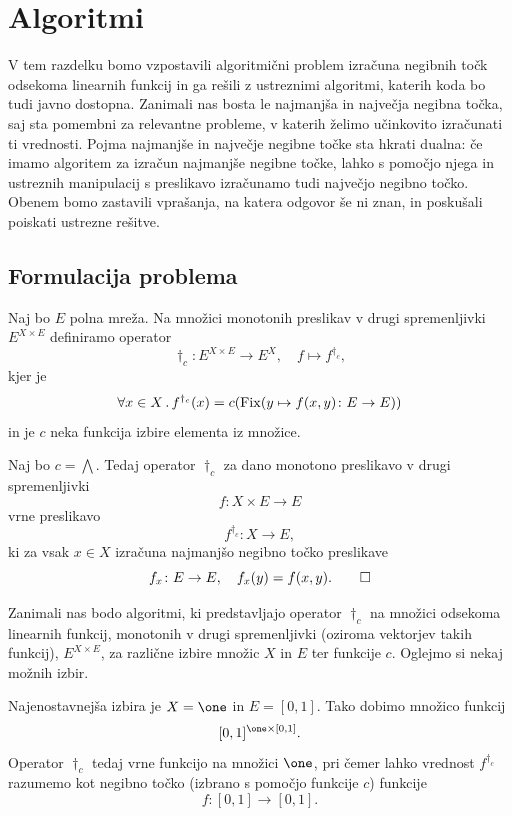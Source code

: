 \section{Algoritmi}
V tem razdelku bomo vzpostavili algoritmični problem izračuna negibnih točk odse\-koma linearnih funkcij in ga rešili z ustreznimi algoritmi, katerih koda bo tudi javno dostopna. Zanimali nas bosta le najmanjša in največja negibna točka, saj sta pomembni za relevantne probleme, v katerih želimo učinkovito izračunati ti vrednosti. Pojma najmanjše in največje negibne točke sta hkrati dualna: če imamo algoritem za izračun najmanjše negibne točke, lahko s pomočjo njega in ustreznih manipulacij s preslikavo izračunamo tudi največjo negibno točko. Obenem bomo zastavili vprašanja, na katera odgovor še ni znan, in poskušali poiskati ustrezne rešitve.  

\subsection{Formulacija problema}
Naj bo \(E\) polna mreža. Na množici monotonih preslikav v drugi spremenljivki \(E^{X \times E}\) definiramo operator 
\[
  \dagger_c: E^{X \times E} \to E^X, \quad f \mapsto f^{\dagger_c},
\] 
kjer je 
\[
  \forall x \in X \,.\, f^{\dagger_c}(x) = c(\operatorname{Fix}(y \mapsto f(x, y) \colon E \to E))
\]
in je \(c\) neka funkcija izbire elementa iz množice.

\begin{zgled}
  Naj bo \(c = \bigwedge\). Tedaj operator \(\dagger_c\) za dano monotono preslikavo v drugi spremenljivki \[f \colon X \times E \to E\] 
  vrne preslikavo 
  \[
    f^{\dagger_c} \colon X \to E,
  \] 
  ki za vsak \(x \in X\) izračuna najmanjšo negibno točko preslikave 
  \[
    f_x \colon E \to E, \quad f_x(y) = f(x, y). \qedhere
  \]
\end{zgled}

Zanimali nas bodo algoritmi, ki predstavljajo operator \(\dagger_c\) na množici odsekoma linearnih funkcij, monotonih v drugi spremenljivki (oziroma vektorjev takih funkcij), \(E^{X \times E}\), za različne izbire množic \(X\) in \(E\) ter funkcije \(c\). Oglejmo si nekaj možnih izbir.

Najenostavnejša izbira je \(X = \one\) in \(E = [0,1]\). Tako dobimo množico funkcij
\[
  [0,1]^{\one \times [0,1]}.
\]
Operator \(\dagger_c\) tedaj vrne funkcijo na množici \(\one\), pri čemer lahko vrednost \(f^{\dagger_c}\) razumemo kot negibno točko (izbrano s pomočjo funkcije \(c\)) funkcije
\[
  f \colon [0,1] \to [0,1].
\]

